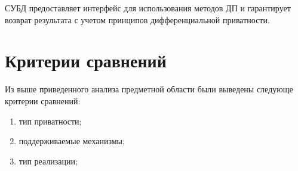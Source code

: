 СУБД предоставляет интерфейс для использования методов ДП и гарантирует возврат результата с учетом принципов дифференциальной приватности.~\cite{main}






\section{Критерии сравнений}

Из выше приведенного анализа предметной области были выведены следующе критерии сравнений:
\begin{enumerate}[label*=---]
	\item тип приватности; 
	\item поддерживаемые механизмы;
	\item тип реализации;
\end{enumerate}


